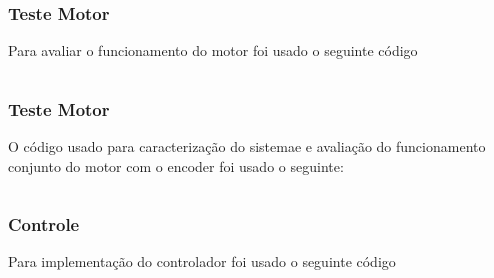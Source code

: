 \documentclass[a4paper,11pt]{article}
\begin{document}
\newpage
\subsubsection*{Teste Motor}
Para avaliar o funcionamento do motor foi usado o seguinte código
\inputminted[xleftmargin=15pt,linenos,frame=single,framesep=5pt,breaklines=true]{c++}{../arduino/test_dcmotor/test_dcmotor.ino}

\newpage
\subsubsection*{Teste Motor}
O código usado para caracterização do sistemae e avaliação do funcionamento conjunto do motor com o encoder foi usado o seguinte:
\inputminted[xleftmargin=15pt,linenos,frame=single,framesep=5pt,breaklines=true]{c++}{../arduino/test_dcmotor_characterization/test_dcmotor_characterization.ino}

\newpage
\subsubsection*{Controle}
Para implementação do controlador foi usado o seguinte código
\inputminted[xleftmargin=15pt,linenos,frame=single,framesep=5pt,breaklines=true]{c++}{../arduino/pid_control/pid_control.ino}

\end{document}
